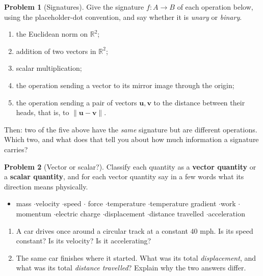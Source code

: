 \documentclass[11pt]{article}
\theoremstyle{definition}
\newtheorem{prob}{Problem}[section]
\newcommand{\R}{\mathbb{R}}
\newcommand{\vc}[1]{\mathbf{#1}}
\newcommand{\norm}[1]{\lVert #1\rVert}
\begin{document}
\begin{prob}[Signatures]
Give the signature $f:A\to B$ of each operation below, using the placeholder-dot
convention, and say whether it is \emph{unary} or \emph{binary}.

\begin{enumerate}[label=\textbf{(\alph*)},leftmargin=2.6em,itemsep=7pt,topsep=6pt]
  \item the Euclidean norm on $\R^{2}$;
  \item addition of two vectors in $\R^{2}$;
  \item scalar multiplication;
  \item the operation sending a vector to its mirror image through the origin;
  \item the operation sending a pair of vectors $\vc{u},\vc{v}$ to the distance
        between their heads, that is, to $\norm{\vc{u}-\vc{v}}$.
\end{enumerate}

\noindent Then: two of the five above have the \emph{same} signature but are
different operations. Which two, and what does that tell you about how much
information a signature carries?
\end{prob}

\begin{prob}[Vector or scalar?]
Classify each quantity as a \textbf{vector quantity} or a \textbf{scalar
quantity}, and for each vector quantity say in a few words what its direction
means physically.

\begin{center}
\begin{minipage}{0.8\textwidth}
\begin{itemize}[leftmargin=1.4em,itemsep=1pt,topsep=2pt]
  \item[] mass \quad$\cdot$\quad velocity \quad$\cdot$\quad speed \quad$\cdot$\quad
          force \quad$\cdot$\quad temperature \quad$\cdot$\quad temperature
          gradient \quad$\cdot$\quad work \quad$\cdot$\quad momentum
          \quad$\cdot$\quad electric charge \quad$\cdot$\quad displacement
          \quad$\cdot$\quad distance travelled \quad$\cdot$\quad acceleration
\end{itemize}
\end{minipage}
\end{center}

\begin{enumerate}[label=\textbf{(\alph*)},leftmargin=2.6em,itemsep=7pt,topsep=6pt]
  \item A car drives once around a circular track at a constant $40$ mph. Is its
        speed constant? Is its velocity? Is it accelerating?
  \item The same car finishes where it started. What was its total
        \emph{displacement}, and what was its total \emph{distance travelled}?
        Explain why the two answers differ.
\end{enumerate}
\end{prob}
\end{document}
